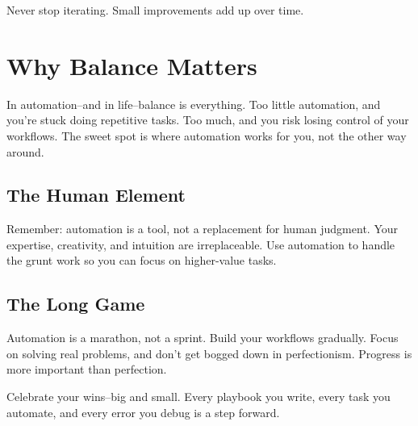 Never stop iterating. Small improvements add up over time.


\section{Why Balance Matters}

In automation--and in life--balance is everything. Too little automation, and you're stuck doing repetitive tasks. Too much, and you risk losing control of your workflows. The sweet spot is where automation works for you, not the other way around.

\subsection{The Human Element}

Remember: automation is a tool, not a replacement for human judgment. Your expertise, creativity, and intuition are irreplaceable. Use automation to handle the grunt work so you can focus on higher-value tasks.

\subsection{The Long Game}

Automation is a marathon, not a sprint. Build your workflows gradually. Focus on solving real problems, and don't get bogged down in perfectionism. Progress is more important than perfection.

Celebrate your wins--big and small. Every playbook you write, every task you automate, and every error you debug is a step forward.

